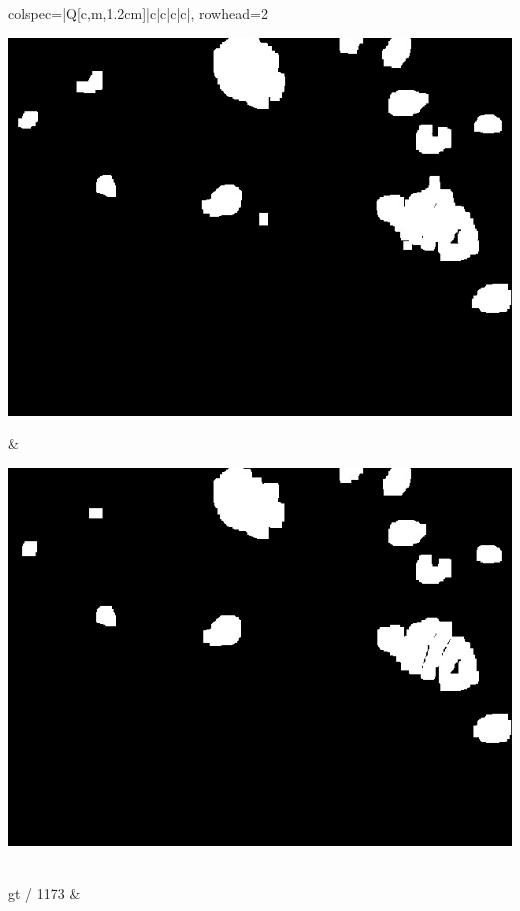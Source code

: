\begin{longtblr}[
            caption = {Hasil uji coba proses \textit{background subtraction} menggunakan GMM yang disempurnakan oleh Operasi Morfologi},
            label = {tab:gmm_morph_9908}
        ]{
            colspec={|Q[c,m,1.2cm]|c|c|c|c|},
            rowhead=2
        }
\begin{minipage}{0.19\textwidth}
                \includegraphics[width=\linewidth]{image/gt_124/gt_124_dilated_5x11_frame705.jpg}
            \end{minipage} & 
            \begin{minipage}{0.19\textwidth}
                \includegraphics[width=\linewidth]{image/gt_124/gt_124_dilated_7x13_frame705.jpg}
            \end{minipage} \\
            \hline
            gt / 1173 &
            \begin{minipage}{0.19\textwidth}

\end{minipage}
\end{longtblr}
